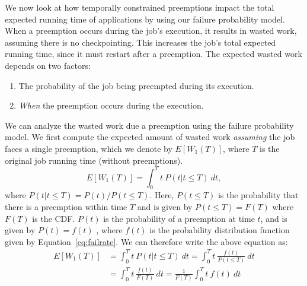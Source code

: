 We now look at how temporally constrained preemptions impact the total expected running time of applications by using our failure probability model. 
%
When a preemption occurs during the job's execution, it results in wasted work, assuming there is no checkpointing. 
This increases the job's total expected running time, since it must restart after a preemption.
%
The expected wasted work depends on two factors:
\begin{enumerate} [leftmargin=12pt]
\item The probability of the job being preempted during its execution. 
\item \emph{When} the preemption occurs during the execution. 
\end{enumerate}

We can analyze the wasted work due a preemption using the failure probability model.
We first compute the expected amount of wasted work \emph{assuming} the job faces a single preemption, which we denote by $E[W_1(T)]$, where $T$ is the original job running time (without preemptions).
\begin{equation}
E[W_1(T)] = \int_0^{T} t~P(t | t \leq T)~dt , 
\end{equation}
where $P(t|t\leq T) = P(t) / P(t \leq T)$. Here, $P(t\leq T)$ is the probability that there is a preemption within time $T$ and is given by $P(t \leq T) = F(T)$ where $F(T)$ is the CDF. 
$P(t)$ is the probability of a preemption at time $t$, and is given by $P(t) = f(t)$ , where $f(t)$ is the probability distribution function given by Equation~\ref{eq:failrate}.
We can therefore write the above equation as:
\begin{align}
  E[W_1(T)] &= \int_0^{T} t~P(t | t \leq T)~dt \nonumber 
  = \int_0^{T} t~\frac{f(t)}{P(t \leq T)}~dt \\ 
  &= \int_0^{T} t~\frac{f(t)}{F(T)}~dt 
    = \frac{1}{F(T)}  \int_0^{T} t~f(t)~dt
    \label{eq:wasted}
\end{align}

